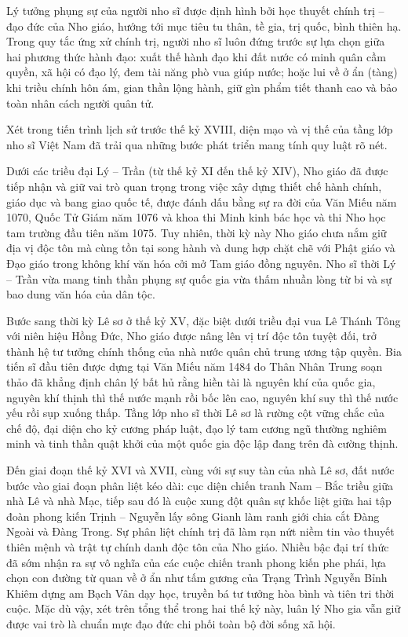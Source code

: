 Lý tưởng phụng sự của người nho sĩ được định hình bởi học thuyết chính trị -- đạo đức của Nho giáo, hướng tới mục tiêu tu thân, tề gia, trị quốc, bình thiên hạ. Trong quy tắc ứng xử chính trị, người nho sĩ luôn đứng trước sự lựa chọn giữa hai phương thức hành đạo: xuất thế hành đạo khi đất nước có minh quân cầm quyền, xã hội có đạo lý, đem tài năng phò vua giúp nước; hoặc lui về ở ẩn (tàng) khi triều chính hôn ám, gian thần lộng hành, giữ gìn phẩm tiết thanh cao và bảo toàn nhân cách người quân tử.

Xét trong tiến trình lịch sử trước thế kỷ XVIII, diện mạo và vị thế của tầng lớp nho sĩ Việt Nam đã trải qua những bước phát triển mang tính quy luật rõ nét.

Dưới các triều đại Lý -- Trần (từ thế kỷ XI đến thế kỷ XIV), Nho giáo đã được tiếp nhận và giữ vai trò quan trọng trong việc xây dựng thiết chế hành chính, giáo dục và bang giao quốc tế, được đánh dấu bằng sự ra đời của Văn Miếu năm 1070, Quốc Tử Giám năm 1076 và khoa thi Minh kinh bác học và thi Nho học tam trường đầu tiên năm 1075. Tuy nhiên, thời kỳ này Nho giáo chưa nắm giữ địa vị độc tôn mà cùng tồn tại song hành và dung hợp chặt chẽ với Phật giáo và Đạo giáo trong không khí văn hóa cởi mở Tam giáo đồng nguyên. Nho sĩ thời Lý -- Trần vừa mang tinh thần phụng sự quốc gia vừa thấm nhuần lòng từ bi và sự bao dung văn hóa của dân tộc.

Bước sang thời kỳ Lê sơ ở thế kỷ XV, đặc biệt dưới triều đại vua Lê Thánh Tông với niên hiệu Hồng Đức, Nho giáo được nâng lên vị trí độc tôn tuyệt đối, trở thành hệ tư tưởng chính thống của nhà nước quân chủ trung ương tập quyền. Bia tiến sĩ đầu tiên được dựng tại Văn Miếu năm 1484 do Thân Nhân Trung soạn thảo đã khẳng định chân lý bất hủ rằng hiền tài là nguyên khí của quốc gia, nguyên khí thịnh thì thế nước mạnh rồi bốc lên cao, nguyên khí suy thì thế nước yếu rồi sụp xuống thấp. Tầng lớp nho sĩ thời Lê sơ là rường cột vững chắc của chế độ, đại diện cho kỷ cương pháp luật, đạo lý tam cương ngũ thường nghiêm minh và tinh thần quật khởi của một quốc gia độc lập đang trên đà cường thịnh.

Đến giai đoạn thế kỷ XVI và XVII, cùng với sự suy tàn của nhà Lê sơ, đất nước bước vào giai đoạn phân liệt kéo dài: cục diện chiến tranh Nam -- Bắc triều giữa nhà Lê và nhà Mạc, tiếp sau đó là cuộc xung đột quân sự khốc liệt giữa hai tập đoàn phong kiến Trịnh -- Nguyễn lấy sông Gianh làm ranh giới chia cắt Đàng Ngoài và Đàng Trong. Sự phân liệt chính trị đã làm rạn nứt niềm tin vào thuyết thiên mệnh và trật tự chính danh độc tôn của Nho giáo. Nhiều bậc đại trí thức đã sớm nhận ra sự vô nghĩa của các cuộc chiến tranh phong kiến phe phái, lựa chọn con đường từ quan về ở ẩn như tấm gương của Trạng Trình Nguyễn Bỉnh Khiêm dựng am Bạch Vân dạy học, truyền bá tư tưởng hòa bình và tiên tri thời cuộc. Mặc dù vậy, xét trên tổng thể trong hai thế kỷ này, luân lý Nho gia vẫn giữ được vai trò là chuẩn mực đạo đức chi phối toàn bộ đời sống xã hội.

